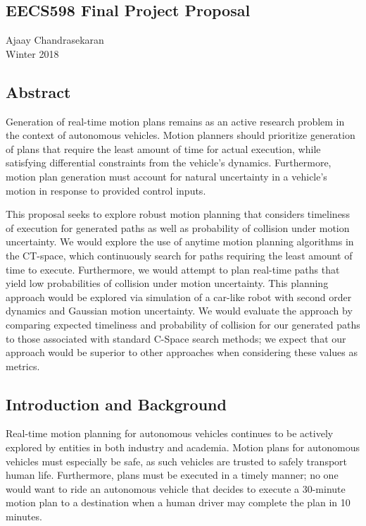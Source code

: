 \documentclass[12pt]{article}
\begin{document}
\begin{center}
\section*{EECS598 Final Project Proposal}
Ajaay Chandrasekaran\\
Winter 2018
\end{center}

\subsection*{Abstract}
Generation of real-time motion plans remains as an active research problem in the context of autonomous vehicles. Motion planners should prioritize generation of plans that require the least amount of time for actual execution, while satisfying differential constraints from the vehicle's dynamics. Furthermore, motion plan generation must account for natural uncertainty in a vehicle's motion in response to provided control inputs.

This proposal seeks to explore robust motion planning that considers timeliness of execution for generated paths as well as probability of collision under motion uncertainty. We would explore the use of anytime motion planning algorithms in the CT-space, which continuously search for paths requiring the least amount of time to execute. Furthermore, we would attempt to plan real-time paths that yield low probabilities of collision under motion uncertainty. This planning approach would be explored via simulation of a car-like robot with second order dynamics and Gaussian motion uncertainty. We would evaluate the approach by comparing expected timeliness and probability of collision for our generated paths to those associated with standard C-Space search methods; we expect that our approach would be superior to other approaches when considering these values as metrics.

\subsection*{Introduction and Background}
Real-time motion planning for autonomous vehicles continues to be actively explored by entities in both industry and academia. Motion plans for autonomous vehicles must especially be safe, as such vehicles are trusted to safely transport human life. Furthermore, plans must be executed in a timely manner; no one would want to ride an autonomous vehicle that decides to execute a 30-minute motion plan to a destination when a human driver may complete the plan in 10 minutes.
\end{document}
